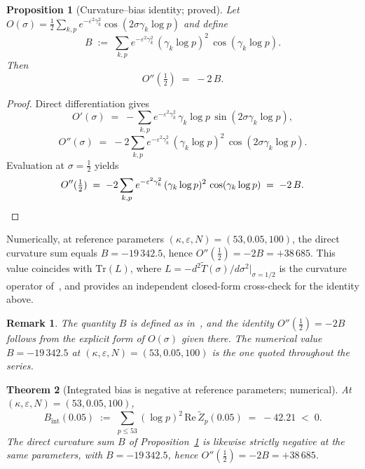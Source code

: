 \documentclass[11pt]{article}
\newtheorem{theorem}{Theorem}[section]
\newtheorem{proposition}[theorem]{Proposition}
\newtheorem*{remark}{Remark}
\newcommand{\Tt}{\widetilde{T}}
\newcommand{\Zt}{\widetilde{Z}}
\begin{document}
\begin{proposition}[Curvature--bias identity; proved]
\label{prop:curv-bias}
Let $O(\sigma)=\tfrac12\sum_{k,p} e^{-\varepsilon^2\gamma_k^2}
\cos(2\sigma\gamma_k\log p)$ and define
\[
B \;:=\; \sum_{k,p} e^{-\varepsilon^2\gamma_k^2}\,(\gamma_k\log p)^2\,
         \cos(\gamma_k\log p).
\]
Then
\[
O''(\tfrac12) \;=\; -2\,B.
\]
\end{proposition}

\begin{proof}
Direct differentiation gives
\[
O'(\sigma) \;=\; -\sum_{k,p} e^{-\varepsilon^2\gamma_k^2}\,\gamma_k\log p\,
                \sin(2\sigma\gamma_k\log p),
\]
\[
O''(\sigma) \;=\; -2\sum_{k,p} e^{-\varepsilon^2\gamma_k^2}\,
                (\gamma_k\log p)^2\,\cos(2\sigma\gamma_k\log p).
\]
Evaluation at $\sigma=\tfrac12$ yields
\[
O''(\tfrac12) \;=\; -2\sum_{k,p} e^{-\varepsilon^2\gamma_k^2}\,
                (\gamma_k\log p)^2\,\cos(\gamma_k\log p) \;=\; -2\,B.
\qedhere
\]
\end{proof}

Numerically, at reference parameters $(\kappa,\varepsilon,N)=(53,0.05,100)$,
the direct curvature sum equals $B=-19\,342.5$, hence
$O''(\tfrac12)=-2B=+38\,685$.
This value coincides with $\mathrm{Tr}(L)$, where
$L=-d^2\Tt(\sigma)/d\sigma^2\big|_{\sigma=1/2}$ is the curvature
operator of~\cite{Paper5}, and provides an independent closed-form
cross-check for the identity above.

\begin{remark}
The quantity $B$ is defined as in~\cite[\S5]{Paper5}, and the identity
$O''(\tfrac12)=-2B$ follows from the explicit form of $O(\sigma)$
given there.
The numerical value $B=-19\,342.5$ at $(\kappa,\varepsilon,N)=(53,0.05,100)$
is the one quoted throughout the series.
\end{remark}

\begin{theorem}[Integrated bias is negative at reference parameters; numerical]
\label{thm:intbias}
At $(\kappa,\varepsilon,N)=(53,0.05,100)$,
\[
B_{\mathrm{int}}(0.05) \;:=\; \sum_{p\le 53}(\log p)^2\,
\mathrm{Re}\,\Zt_p(0.05) \;=\; -42.21 \;<\; 0.
\]
The direct curvature sum $B$ of Proposition~\ref{prop:curv-bias} is
likewise strictly negative at the same parameters, with
$B=-19\,342.5$, hence $O''(\tfrac12)=-2B=+38\,685$.
\end{theorem}
\end{document}

